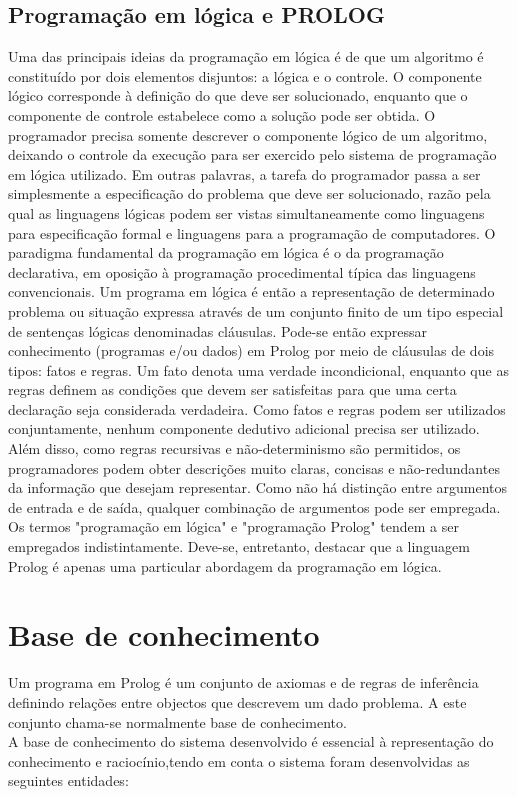 \documentclass[25pt]{article}
\begin{document}
\subsection{Programação em lógica e PROLOG}
Uma das principais ideias da programação em lógica é de que um algoritmo é constituído por dois
elementos disjuntos: a lógica e o controle. O componente lógico corresponde à definição do que deve
ser solucionado, enquanto que o componente de controle estabelece como a solução pode ser obtida.
O programador precisa somente descrever o componente lógico de um algoritmo, deixando o controle
da execução para ser exercido pelo sistema de programação em lógica utilizado. Em outras palavras, a
tarefa do programador passa a ser simplesmente a especificação do problema que deve ser solucionado, razão pela qual as
linguagens lógicas podem ser vistas simultaneamente como linguagens para
especificação formal e linguagens para a programação de computadores.
O paradigma fundamental da programação em lógica é o da programação declarativa, em oposição à
programação procedimental típica das linguagens convencionais.
Um programa em lógica é então a representação de determinado problema ou situação expressa através de um conjunto finito
de um tipo especial de sentenças lógicas denominadas cláusulas.
Pode-se então expressar conhecimento (programas e/ou dados) em Prolog por meio de cláusulas de
dois tipos: fatos e regras. Um fato denota uma verdade incondicional, enquanto que as regras definem as condições que devem ser satisfeitas para que
uma certa declaração seja considerada verdadeira. Como fatos e regras podem ser utilizados conjuntamente, nenhum componente
dedutivo adicional precisa ser utilizado. Além disso, como regras recursivas e não-determinismo são permitidos, os programadores podem obter
descrições muito claras, concisas e não-redundantes da informação que desejam representar. Como não há distinção entre argumentos
de entrada e de saída, qualquer combinação de argumentos pode ser empregada.
Os termos "programação em lógica" e "programação Prolog" tendem a ser empregados indistintamente. Deve-se, entretanto, destacar
que a linguagem Prolog é apenas uma particular abordagem da
programação em lógica.
\newpage
\section{Base de conhecimento}
Um programa em Prolog é um conjunto de axiomas e de regras de inferência definindo relações entre objectos que descrevem
um dado problema. A este conjunto chama-se normalmente base de conhecimento.\\
A base de conhecimento do sistema desenvolvido é essencial à representação do conhecimento e raciocínio,tendo em conta o sistema
foram desenvolvidas as seguintes entidades:
\end{document}

